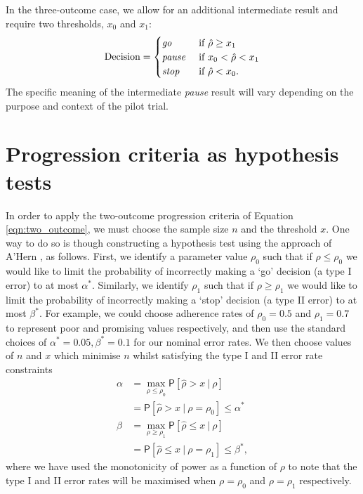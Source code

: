 \documentclass{bmcart}
\newcommand{\PR}{{\mathsf P}}
\begin{document}
In the three-outcome case, we allow for an additional intermediate result and require two thresholds, $x_0$ and $x_1$:
\begin{equation}\label{eqn:three_outcome}
\text{Decision} = 
\begin{cases}
\text{\emph{go}} & \text{ if } \hat{\rho} \geq x_1 \\
\text{\emph{pause}} & \text{ if } x_0 < \hat{\rho} < x_1 \\
\text{\emph{stop}} & \text{ if } \hat{\rho} < x_0. \\
\end{cases}
\end{equation}
The specific meaning of the intermediate \emph{pause} result will vary depending on the purpose and context of the pilot trial. 

\section{Progression criteria as hypothesis tests}\label{sec:tests}

In order to apply the two-outcome progression criteria of Equation \ref{eqn:two_outcome}, we must choose the sample size $n$ and the threshold $x$. One way to do so is though constructing a hypothesis test using the approach of A'Hern \cite{AHern2001}, as follows. First, we identify a parameter value $\rho_0$ such that if $\rho \leq \rho_0$ we would like to limit the probability of incorrectly making a `go' decision (a type I error) to at most $\alpha^*$. Similarly, we identify $\rho_1$ such that if $\rho \geq \rho_1$ we would like to limit the probability of incorrectly making a `stop' decision (a type II error) to at most $\beta^*$. For example, we could choose adherence rates of $\rho_0 = 0.5$ and $\rho_1 = 0.7$ to represent poor and promising values respectively, and then use the standard choices of $\alpha^* = 0.05, \beta^* = 0.1$ for our nominal error rates. We then choose values of $n$ and $x$ which minimise $n$ whilst satisfying the type I and II error rate constraints
\begin{align}
\alpha &= \max_{\rho \leq \rho_0} \PR[ \hat{\rho} > x ~ | ~ \rho] \\
&= \PR[ \hat{\rho} > x ~ | ~ \rho = \rho_0] \leq \alpha^* \\
\beta &= \max_{\rho \geq \rho_1} \PR[ \hat{\rho} \leq x ~ | ~ \rho] \\
&= \PR[ \hat{\rho} \leq x ~ | ~ \rho = \rho_1] \leq \beta^*,
\end{align}
where we have used the monotonicity of power as a function of $\rho$ to note that the type I and II error rates will be maximised when $\rho = \rho_0$ and $\rho = \rho_1$ respectively.
\end{document}
